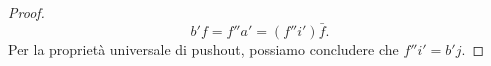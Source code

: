 \begin{proof}
\[    b'f = f'' a' = (f''i') \bar{f} .
  \]
  Per la proprietà universale di pushout, possiamo concludere che
  \(f''i' = b'j\).
\end{proof}



